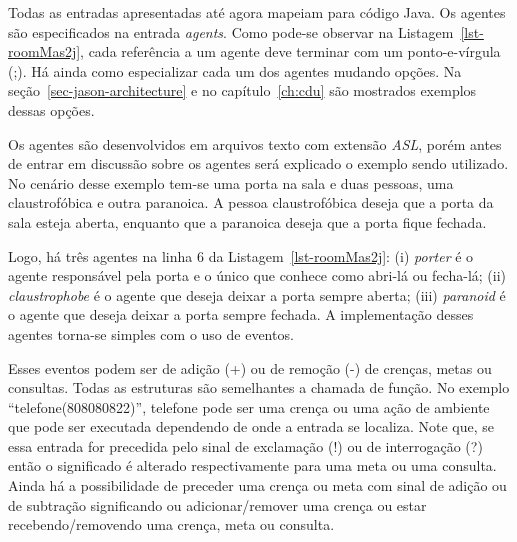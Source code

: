 Todas as entradas apresentadas até agora mapeiam para código Java.
Os agentes são especificados na entrada \emph{agents}. Como pode-se
observar na Listagem~\ref{lst-roomMas2j}, cada referência a um agente deve
terminar com um ponto-e-vírgula (;). Há ainda como especializar cada um dos
agentes mudando opções. Na seção~\ref{sec-jason-architecture} e no
capítulo~\ref{ch:cdu} são mostrados exemplos dessas opções.

Os agentes são desenvolvidos em arquivos texto com extensão \emph{ASL}, porém
antes de entrar em discussão sobre os agentes será explicado o exemplo sendo
utilizado. No cenário desse exemplo tem-se uma porta na sala e duas pessoas, uma
claustrofóbica e outra paranoica. A pessoa claustrofóbica deseja que a
porta da sala esteja aberta, enquanto que a paranoica deseja que a porta
fique fechada.

Logo, há três agentes na linha 6 da Listagem~\ref{lst-roomMas2j}:
(i) \emph{porter} é o agente responsável pela porta e o único que conhece
como abri-lá ou fecha-lá;
(ii) \emph{claustrophobe} é o agente que deseja deixar a porta sempre aberta;
(iii) \emph{paranoid} é o agente que deseja deixar a porta sempre fechada.
A implementação desses agentes torna-se simples com o uso de eventos.

Esses eventos podem ser de adição (+) ou de remoção (-) de crenças, metas ou
consultas. Todas as estruturas são semelhantes a chamada de função. No
exemplo ``telefone(808080822)'', telefone pode ser uma crença ou uma ação de
ambiente que pode ser executada dependendo de onde a entrada se localiza.
Note que, se essa entrada for precedida pelo sinal de exclamação (!) ou de
interrogação (?) então o significado é alterado respectivamente para uma meta
ou uma consulta. Ainda há a possibilidade de preceder uma crença ou meta
com sinal de adição ou de subtração significando ou adicionar/remover uma
crença ou estar recebendo/removendo uma crença, meta ou consulta.

